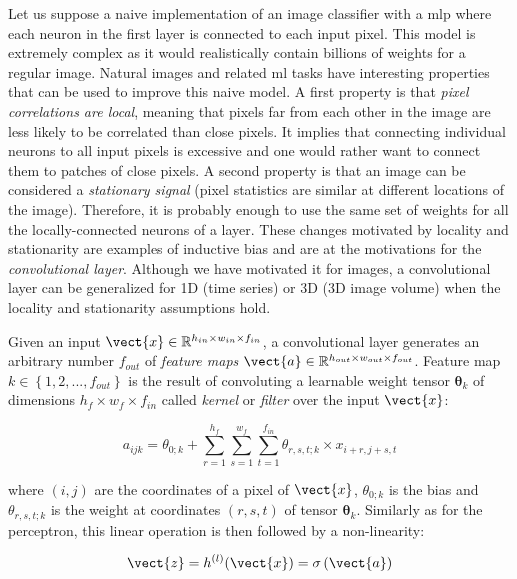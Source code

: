 Let us suppose a naive implementation of an image classifier with a \acrshort{mlp} where each neuron in the first layer is connected to each input pixel. This model is extremely complex as it would realistically contain billions of weights for a regular image. Natural images and related \acrlong{ml} tasks have interesting properties that can be used to improve this naive model. A first property is that \textit{pixel correlations are local}, meaning that pixels far from each other in the image are less likely to be correlated than close pixels. It implies that connecting individual neurons to all input pixels is excessive and one would rather want to connect them to patches of close pixels. A second property is that an image can be considered a \textit{stationary signal} (\ie pixel statistics are similar at different locations of the image). Therefore, it is probably enough to use the same set of weights for all the locally-connected neurons of a layer. These changes motivated by locality and stationarity are examples of inductive bias and are at the motivations for the \textit{convolutional layer}. Although we have motivated it for images, a convolutional layer can be generalized for 1D (\eg time series) or 3D (\eg 3D image volume) when the locality and stationarity assumptions hold.   

Given an input $\vect{x} \in \mathbb{R}^{h_{in} \times w_{in} \times f_{in}}$, a convolutional layer generates an arbitrary number $f_{out}$ of \textit{feature maps} $\vect{a} \in \mathbb{R}^{h_{out} \times w_{out} \times f_{out}}$. Feature map $k \in \left\{1, 2, ..., f_{out}\right\}$ is the result of convoluting a learnable weight tensor $\pmb{\theta}_k$ of dimensions $h_f \times w_f \times f_{in}$ called \textit{kernel} or \textit{filter} over the input $\vect{x}$:

\begin{equation}
\label{eqn:backml:convnet}
a_{ijk} = \theta_{0;k} + \sum_{r=1}^{h_f} \sum_{s=1}^{w_f} \sum_{t=1}^{f_{in}} \theta_{r,s,t;k} \times x_{i+r,j+s,t}
\end{equation}

where $(i, j)$ are the coordinates of a pixel of $\vect{x}$, $\theta_{0;k}$ is the bias and $\theta_{r,s,t;k}$ is the weight at coordinates $(r,s,t)$ of tensor $\pmb{\theta}_k$. Similarly as for the perceptron, this linear operation is then followed by a non-linearity:

\begin{equation}
\label{eqn:backml:convnetwithactiv}
\vect{z} = h^{(l)}(\vect{x}) = \sigma\left(\vect{a}\right)
\end{equation}

